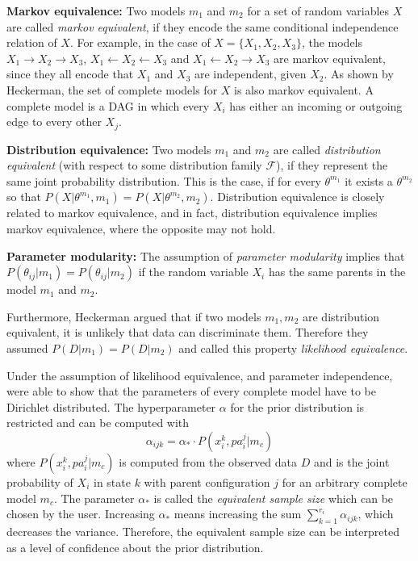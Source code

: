 \documentclass{article}
\begin{document}
	\textbf{Markov equivalence:}
	Two models $m_1$ and $m_2$ for a set of random variables $X$ are called \textit{markov equivalent},
	if they encode the same conditional independence relation of $X$. For example, in the case of
	$X=\{X_1,X_2,X_3\}$, the models $X_1 \rightarrow X_2 \rightarrow X_3$,
	$X_1 \leftarrow X_2 \leftarrow X_3$ and $X_1 \leftarrow X_2 \rightarrow X_3$ are 
	markov equivalent, since they all encode that $X_1$ and $X_3$ are independent, given $X_2$.
	As shown by Heckerman, the set of complete models for $X$ is also markov equivalent. 
	A complete model is a DAG in which every $X_i$ has either an 	incoming or outgoing edge 
	to every other $X_j$.
	
	\textbf{Distribution equivalence:}
	Two models $m_1$ and $m_2$ are called \textit{distribution equivalent} (with respect to some distribution
	family $\mathcal{F}$), if they represent the same
	joint probability distribution. This is the case, if for every $\theta^{m_1}$ it exists a $\theta^{m_2}$
	so that $P(X|\theta^{m_1},m_1) = P(X|\theta^{m_2},m_2)$. Distribution equivalence is closely related
	to markov equivalence, and in fact, distribution equivalence implies markov equivalence, where the
	opposite may not hold.
	
	\textbf{Parameter modularity:}
	The assumption of \textit{parameter modularity} implies that $P(\theta_{ij}|m_1) = P(\theta_{ij}|m_2)$
	if the random variable $X_i$ has the same parents in the model $m_1$ and $m_2$.
	
	Furthermore, Heckerman argued that if two models $m_1,m_2$ are distribution equivalent,
	it is unlikely that data can	discriminate them. Therefore they assumed $P(D|m_1)=P(D|m_2)$ and called this
	property \textit{likelihood equivalence}.
	
	Under the assumption of likelihood equivalence, and	parameter independence, \citep{hcg} were able to
	show that the parameters of every complete model have to be Dirichlet distributed.	
	The hyperparameter $\alpha$ for the prior distribution is restricted and can be computed with
	\[
		\alpha_{ijk} = \alpha_* \cdot P(x_i^k, pa_i^j|m_c)
	\]
	where $P(x_i^k,pa_i^j|m_c)$ is computed from the observed data $D$ and is the joint probability
	of $X_i$ in state $k$ with parent configuration $j$ for
	an arbitrary complete model $m_c$. The parameter $\alpha_*$ is called
	the \textit{equivalent sample size} which can be chosen by the user. Increasing $\alpha_*$ means
	increasing the sum $\sum_{k=1}^{r_i} \alpha_{ijk}$, which decreases the variance. Therefore, the
	equivalent sample size can be interpreted as a level of confidence about the prior distribution.
	
\end{document}
